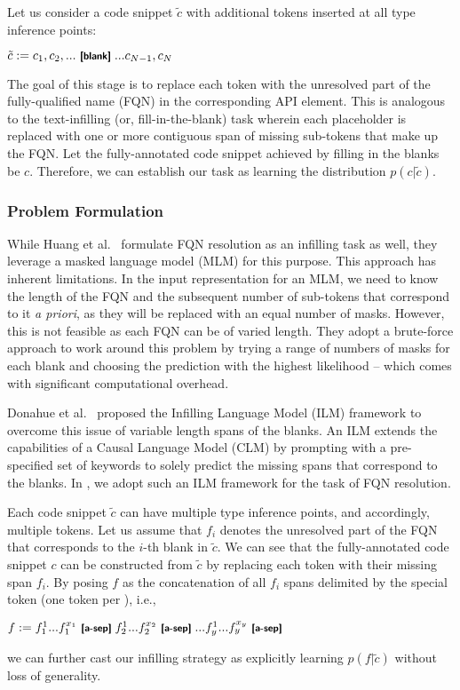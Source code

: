 Let us consider a code snippet $\tilde{c}$ with additional \blank tokens inserted at all type inference points:
\begin{center}
$\tilde{c}:= c_1, c_2, ...\text{ \blank}... c_{N-1}, c_N$
\end{center}
The goal of this stage is to replace each \blank token with the unresolved part of the fully-qualified name (FQN) in the corresponding API element. This is analogous to the text-infilling (or, fill-in-the-blank) task wherein each placeholder \blank is replaced with one or more contiguous span of missing sub-tokens that make up the FQN. Let the fully-annotated code snippet achieved by filling in the blanks be $c$. Therefore, we can establish our task as learning the distribution $p(c|\tilde{c})$.

\subsubsection{Problem Formulation}
\label{sec:ilm-form}
While Huang et al.~\cite{prompt-ase22} formulate FQN resolution as an infilling task as well, they leverage a masked language model (MLM) for 
this purpose.
This approach has inherent limitations. In the input representation for an MLM, we need to know the length of the FQN and the subsequent number of sub-tokens that correspond to it \textit{a priori}, as they will be replaced with an equal number of masks. However, this is not feasible as each FQN can be of varied length. They adopt a brute-force approach to work around this problem by trying a range of numbers of masks for each blank and choosing the prediction with the highest likelihood -- which comes with significant computational overhead.

Donahue et al.~\cite{donahue-etal-2020-enabling} proposed the Infilling Language Model (ILM) framework to overcome this issue of variable length spans of the blanks. An ILM extends the capabilities of a Causal Language Model (CLM) by prompting with a pre-specified set of keywords to solely predict the missing spans that correspond to the blanks. In \tool, we adopt such an ILM framework for the task of FQN resolution.

Each code snippet $\tilde{c}$ can have multiple type inference points, and accordingly, multiple \blank tokens. Let us assume that $f_i$ denotes the unresolved part of the FQN that corresponds to the $i$-th blank in $\tilde{c}$. We can see that the fully-annotated code snippet $c$ can be constructed from $\tilde{c}$ by replacing each \blank token with their missing span $f_i$. By posing $f$ as the concatenation of all $f_i$ spans delimited by the special \answer token (one \answer token per \blank), i.e.,
\begin{center}
    $f:= f_1^{1} ... f_1^{x_1} \text{ \answer } f_2^{1} ... f_2^{x_2} \text{ \answer } ... f_y^{1} ... f_y^{x_y} \text{ \answer}$
\end{center}
we can further cast our infilling strategy as explicitly learning $p(f|\tilde{c})$  without loss of generality.

